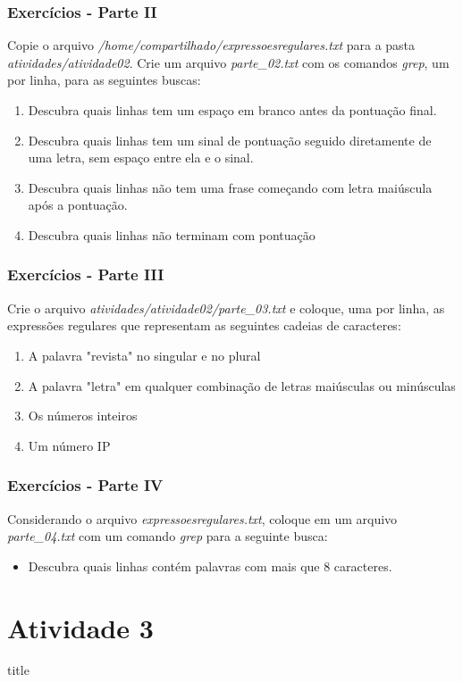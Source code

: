 \documentclass{beamer}
\begin{document}
   \begin{frame}
      \frametitle{Exercícios - Parte II}
      Copie o arquivo \textit{/home/compartilhado/expressoesregulares.txt} para a pasta \textit{atividades/atividade02}. Crie um arquivo \textit{parte\_02.txt} com os comandos \textit{grep}, um por linha, para as seguintes buscas:
      \begin{enumerate}
         \item Descubra quais linhas tem um espaço em branco antes da pontuação final.
	 \item Descubra quais linhas tem um sinal de pontuação seguido diretamente de uma letra, sem espaço entre ela e o sinal.
	 \item Descubra quais linhas não tem uma frase começando com letra maiúscula após a pontuação.
	 \item Descubra quais linhas não terminam com pontuação
      \end{enumerate}
   \end{frame}

   \begin{frame}
      \frametitle{Exercícios - Parte III}
      Crie o arquivo \textit{atividades/atividade02/parte\_03.txt} e coloque, uma por linha, as expressões regulares que representam as seguintes cadeias de caracteres:
      \begin{enumerate}
         \item A palavra "revista" no singular e no plural
	 \item A palavra "letra" em qualquer combinação de letras maiúsculas ou minúsculas
	 \item Os números inteiros
	 \item Um número IP 
      \end{enumerate}
   \end{frame}

   \begin{frame}
      \frametitle{Exercícios - Parte IV}
      Considerando o arquivo \textit{expressoesregulares.txt}, coloque em um arquivo \textit{parte\_04.txt} com um comando \textit{grep} para a seguinte busca:
      \begin{itemize}
         \item Descubra quais linhas contém palavras com mais que 8 caracteres.
      \end{itemize}
   \end{frame}


\section{Atividade 3}
   \begin{frame}
      \begin{beamercolorbox}[sep=8pt,center,shadow=true,rounded=true]{title}
      \insertsectionhead\par%
      \end{beamercolorbox}
   \end{frame}
\end{document}
